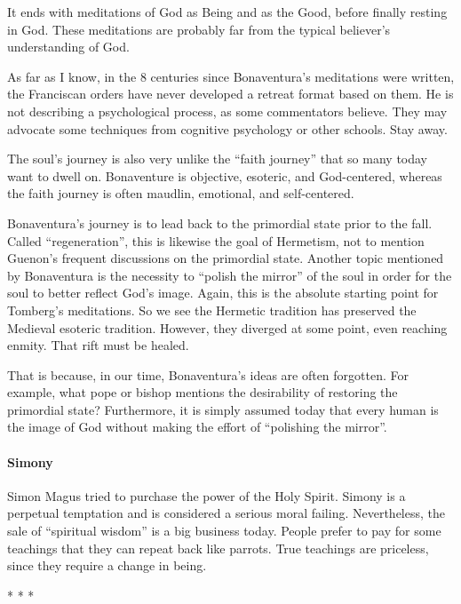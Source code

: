 It ends with meditations of God as Being and as the Good, before finally resting in God. These meditations are probably far from the typical believer's understanding of God.

As far as I know, in the 8 centuries since Bonaventura's meditations were written, the Franciscan orders have never developed a retreat format based on them. He is not describing a psychological process, as some commentators believe. They may advocate some techniques from cognitive psychology or other schools. Stay away.

The soul's journey is also very unlike the ``faith journey'' that so many today want to dwell on. Bonaventure is objective, esoteric, and God-centered, whereas the faith journey is often maudlin, emotional, and self-centered.

Bonaventura's journey is to lead back to the primordial state prior to the fall. Called ``regeneration'', this is likewise the goal of Hermetism, not to mention Guenon's frequent discussions on the primordial state. Another topic mentioned by Bonaventura is the necessity to ``polish the mirror'' of the soul in order for the soul to better reflect God's image. Again, this is the absolute starting point for Tomberg's meditations. So we see the Hermetic tradition has preserved the Medieval esoteric tradition. However, they diverged at some point, even reaching enmity. That rift must be healed.

That is because, in our time, Bonaventura's ideas are often forgotten. For example, what pope or bishop mentions the desirability of restoring the primordial state? Furthermore, it is simply assumed today that every human is the image of God without making the effort of ``polishing the mirror''.

\paragraph{Simony}


Simon Magus tried to purchase the power of the Holy Spirit. Simony is a perpetual temptation and is considered a serious moral failing. Nevertheless, the sale of ``spiritual wisdom'' is a big business today. People prefer to pay for some teachings that they can repeat back like parrots. True teachings are priceless, since they require a change in being.



\begin{center}* * *\end{center}


